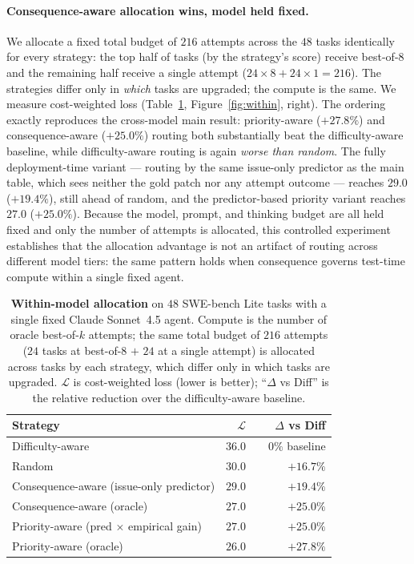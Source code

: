 \documentclass{article}
\begin{document}
\paragraph{Consequence-aware allocation wins, model held fixed.}
We allocate a fixed total budget of $216$ attempts across the $48$
tasks identically for every strategy: the top half of tasks (by the
strategy's score) receive best-of-$8$ and the remaining half receive
a single attempt ($24{\times}8 + 24{\times}1 = 216$). The strategies
differ only in \emph{which} tasks are upgraded; the compute is the
same. We measure cost-weighted loss
(Table~\ref{tab:within}, Figure~\ref{fig:within}, right). The ordering
exactly reproduces the cross-model main result: priority-aware
($+27.8\%$) and consequence-aware ($+25.0\%$) routing both
substantially beat the difficulty-aware baseline, while
difficulty-aware routing is again \emph{worse than random}. The
fully deployment-time variant --- routing by the same issue-only
predictor as the main table, which sees neither the gold patch nor
any attempt outcome --- reaches $29.0$ ($+19.4\%$), still ahead of
random, and the predictor-based priority variant reaches $27.0$
($+25.0\%$). Because the model, prompt, and thinking budget are all held fixed and
only the number of attempts is allocated, this controlled experiment
establishes that the allocation advantage is not an
artifact of routing across different model tiers: the same pattern
holds when consequence governs test-time compute within a single
fixed agent.

\begin{table}[h]
\centering
\caption{\textbf{Within-model allocation} on $48$ SWE-bench Lite tasks
with a single fixed Claude Sonnet~4.5 agent. Compute is the number of
oracle best-of-$k$ attempts; the same total budget of $216$ attempts
($24$ tasks at best-of-$8$ $+$ $24$ at a single attempt) is allocated
across tasks by each strategy, which differ only in which tasks are
upgraded. $\mathcal{L}$ is cost-weighted loss (lower is better);
``$\Delta$ vs Diff'' is the relative reduction over the
difficulty-aware baseline.}
\label{tab:within}
\small
\begin{tabular}{lrr}
\toprule
Strategy & $\mathcal{L}$ & $\Delta$ vs Diff \\
\midrule
Difficulty-aware             & $36.0$ & ~~$0\%$ baseline \\
Random                       & $30.0$ & $+16.7\%$ \\
Consequence-aware (issue-only predictor) & $29.0$ & $+19.4\%$ \\
Consequence-aware (oracle)   & $27.0$ & $+25.0\%$ \\
Priority-aware (pred $\times$ empirical gain) & $27.0$ & $+25.0\%$ \\
Priority-aware (oracle)      & $\mathbf{26.0}$ & $\mathbf{+27.8\%}$ \\
\bottomrule
\end{tabular}
\end{table}
\end{document}
